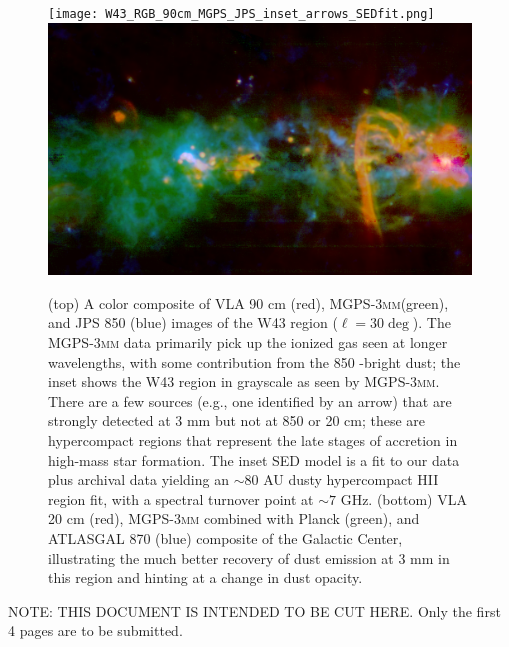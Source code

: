 \documentclass[11pt,preprint]{aastex_nofoot}
\newcommand{\MGPS}{\textsc{MGPS-3mm}\xspace}
\begin{document}
\begin{figure}
\texttt{[image: W43\_RGB\_90cm\_MGPS\_JPS\_inset\_arrows\_SEDfit.png]}
\includegraphics[width=16cm]{SgrB2_RGB_20cm_MGPSplanck_ATLASGAL.png}
\caption{
(top) A color composite of VLA 90 cm (red), \MGPS (green), and JPS 850 \um (blue)
images of the W43 region ($\ell=30\deg$).  The \MGPS data primarily pick up
the ionized gas seen at longer wavelengths, with some contribution from the 
850 \um-bright dust; the inset shows the W43 region in grayscale as seen by
\MGPS.  There are a few sources (e.g., one identified by an arrow) that are
strongly detected at 3 mm but not at 850 \um or 20 cm; these are hypercompact
\hii regions that represent
the late stages of accretion in high-mass star formation.  The inset SED
model is a fit to our data plus archival data yielding an $\sim80$ AU 
dusty hypercompact HII region fit, with a spectral turnover point at $\sim7$
GHz.
(bottom) VLA 20 cm (red), \MGPS combined with Planck (green), and ATLASGAL
870 \um (blue) composite of the Galactic Center, illustrating the much better
recovery of dust emission at 3 mm in this region and hinting at a change in
dust opacity.
}
\label{fig:figure}
\end{figure}

\clearpage

NOTE: THIS DOCUMENT IS INTENDED TO BE CUT HERE.  Only the first 4 pages are to be submitted.
\end{document}
